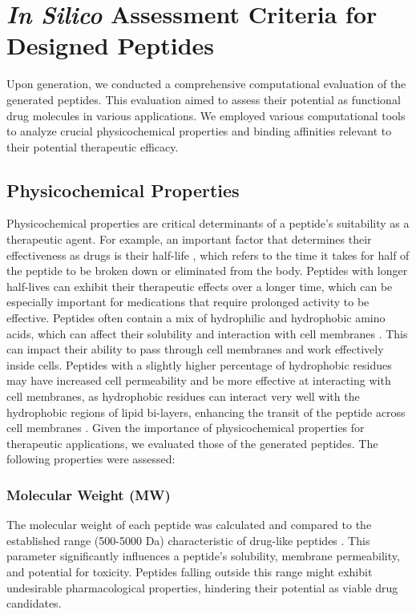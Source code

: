 \section{\textit{In Silico} Assessment Criteria for Designed Peptides}
Upon generation, we conducted a comprehensive computational evaluation of the generated peptides. This evaluation aimed to assess their potential as functional drug molecules in various applications. We employed various computational tools to analyze crucial physicochemical properties and binding affinities relevant to their potential therapeutic efficacy.

\subsection{Physicochemical Properties}
Physicochemical properties are critical determinants of a peptide's suitability as a therapeutic agent. For example, an important factor that determines their effectiveness as drugs is their half-life \cite{nugrahadi2023designing}, which refers to the time it takes for half of the peptide to be broken down or eliminated from the body. Peptides with longer half-lives can exhibit their therapeutic effects over a longer time, which can be especially important for medications that require prolonged activity to be effective. Peptides often contain a mix of hydrophilic and hydrophobic amino acids, which can affect their solubility and interaction with cell membranes \cite{madani2011mechanisms}. This can impact their ability to pass through cell membranes and work effectively inside cells. Peptides with a slightly higher percentage of hydrophobic residues may have increased cell permeability \cite{madani2011mechanisms} and be more effective at interacting with cell membranes, as hydrophobic residues can interact very well with the hydrophobic regions of lipid bi-layers, enhancing the transit of the peptide across cell membranes \cite{madani2011mechanisms}. Given the importance of physicochemical properties for therapeutic applications, we evaluated those of the generated peptides. The following properties were assessed:

\subsubsection{Molecular Weight (MW)}
The molecular weight of each peptide was calculated and compared to the established range (500-5000 Da) characteristic of drug-like peptides \cite{erckes2022story}. This parameter significantly influences a peptide's solubility, membrane permeability, and potential for toxicity. Peptides falling outside this range might exhibit undesirable pharmacological properties, hindering their potential as viable drug candidates.

